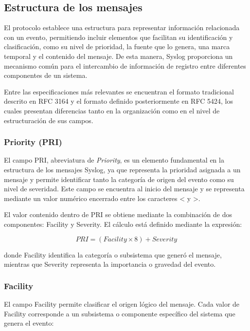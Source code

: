 \subsection{Estructura de los mensajes}
El protocolo establece una estructura para representar información relacionada con un evento, permitiendo incluir elementos que facilitan su identificación y clasificación, como su nivel de prioridad, la fuente que lo genera, una marca temporal y el contenido del mensaje. De esta manera, Syslog proporciona un mecanismo común para el intercambio de información de registro entre diferentes componentes de un sistema.

Entre las especificaciones más relevantes se encuentran el formato tradicional descrito en RFC 3164 y el formato definido posteriormente en RFC 5424, los cuales presentan diferencias tanto en la organización como en el nivel de estructuración de sus campos.

\subsubsection{Priority (PRI)}
El campo PRI, abreviatura de \textit{Priority}, es un elemento fundamental en la estructura de los mensajes Syslog, ya que representa la prioridad asignada a un mensaje y permite identificar tanto la categoría de origen del evento como su nivel de severidad. Este campo se encuentra al inicio del mensaje y se representa mediante un valor numérico encerrado entre los caracteres < y >.

El valor contenido dentro de PRI se obtiene mediante la combinación de dos componentes: Facility y Severity. El cálculo está definido mediante la expresión:

\begin{equation}
    PRI = (Facility \times 8) + Severity
\end{equation}

donde Facility identifica la categoría o subsistema que generó el mensaje, mientras que Severity representa la importancia o gravedad del evento.

\subsubsection{Facility}
El campo Facility permite clasificar el origen lógico del mensaje. Cada valor de Facility corresponde a un subsistema o componente específico del sistema que genera el evento:




